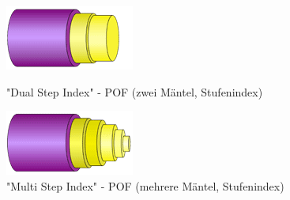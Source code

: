 \begin{figure}[h]
    \begin{center}
        \begin{minipage}[t]{0.4\textwidth}
            \begin{center}
                \includegraphics[height=0.1\textheight]{Bilder/Optische_Wellenleiter_Die_Polymer_Optische_Faser/Brechzahlprofile/pofdsi.png}
                \caption["Dual
                Step Index" - POF (zwei Mäntel, Stufenindex)
                \newline
                \url{POFAC}]{"Dual
                Step Index" - POF (zwei Mäntel, Stufenindex)}
                \label{fig:pofdsi}
            \end{center}
        \end{minipage}
        \hspace{0.025\textwidth}
        \begin{minipage}[t]{0.4\textwidth}
            \begin{center}
                \includegraphics[height=0.1\textheight]{Bilder/Optische_Wellenleiter_Die_Polymer_Optische_Faser/Brechzahlprofile/pofmsi.png}
                \caption["Multi
                Step Index" - POF (mehrere Mäntel, Stufenindex)
                \newline
                \url{POFAC}]{"Multi
                Step Index" - POF (mehrere Mäntel, Stufenindex)}
                \label{fig:pofmsi}
            \end{center}
        \end{minipage}
    \end{center}


\end{figure}
